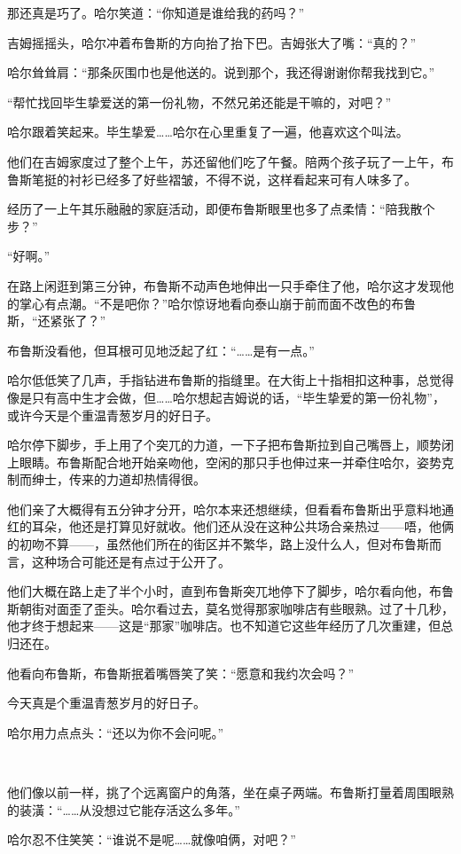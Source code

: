 \documentclass[../main]{subfiles}
\begin{document}
那还真是巧了。哈尔笑道：“你知道是谁给我的药吗？”

吉姆摇摇头，哈尔冲着布鲁斯的方向抬了抬下巴。吉姆张大了嘴：“真的？”

哈尔耸耸肩：“那条灰围巾也是他送的。说到那个，我还得谢谢你帮我找到它。”

“帮忙找回毕生挚爱送的第一份礼物，不然兄弟还能是干嘛的，对吧？”

哈尔跟着笑起来。毕生挚爱……哈尔在心里重复了一遍，他喜欢这个叫法。

他们在吉姆家度过了整个上午，苏还留他们吃了午餐。陪两个孩子玩了一上午，布鲁斯笔挺的衬衫已经多了好些褶皱，不得不说，这样看起来可有人味多了。

经历了一上午其乐融融的家庭活动，即便布鲁斯眼里也多了点柔情：“陪我散个步？”

“好啊。”

在路上闲逛到第三分钟，布鲁斯不动声色地伸出一只手牵住了他，哈尔这才发现他的掌心有点潮。“不是吧你？”哈尔惊讶地看向泰山崩于前而面不改色的布鲁斯，“还紧张了？”

布鲁斯没看他，但耳根可见地泛起了红：“……是有一点。”

哈尔低低笑了几声，手指钻进布鲁斯的指缝里。在大街上十指相扣这种事，总觉得像是只有高中生才会做，但……哈尔想起吉姆说的话，“毕生挚爱的第一份礼物”，或许今天是个重温青葱岁月的好日子。

哈尔停下脚步，手上用了个突兀的力道，一下子把布鲁斯拉到自己嘴唇上，顺势闭上眼睛。布鲁斯配合地开始亲吻他，空闲的那只手也伸过来一并牵住哈尔，姿势克制而绅士，传来的力道却热情得很。

他们亲了大概得有五分钟才分开，哈尔本来还想继续，但看看布鲁斯出乎意料地通红的耳朵，他还是打算见好就收。他们还从没在这种公共场合亲热过——唔，他俩的初吻不算——，虽然他们所在的街区并不繁华，路上没什么人，但对布鲁斯而言，这种场合可能还是有点过于公开了。

他们大概在路上走了半个小时，直到布鲁斯突兀地停下了脚步，哈尔看向他，布鲁斯朝街对面歪了歪头。哈尔看过去，莫名觉得那家咖啡店有些眼熟。过了十几秒，他才终于想起来——这是“那家”咖啡店。也不知道它这些年经历了几次重建，但总归还在。

他看向布鲁斯，布鲁斯抿着嘴唇笑了笑：“愿意和我约次会吗？”

今天真是个重温青葱岁月的好日子。

哈尔用力点点头：“还以为你不会问呢。”

~\

他们像以前一样，挑了个远离窗户的角落，坐在桌子两端。布鲁斯打量着周围眼熟的装潢：“……从没想过它能存活这么多年。”

哈尔忍不住笑笑：“谁说不是呢……就像咱俩，对吧？”
\end{document}
